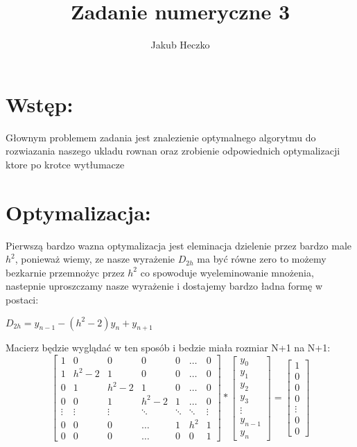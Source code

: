 \documentclass[12pt]{article}
\title{Zadanie numeryczne 3}
\author{Jakub Heczko}
\date{}
\begin{document}
\section{Wstęp:}
Głownym problemem zadania jest znalezienie optymalnego algorytmu do rozwiazania naszego ukladu rownan oraz zrobienie odpowiednich optymalizacji ktore po krotce wytłumacze
\section{Optymalizacja:}
Pierwszą bardzo wazna optymalizacja jest eleminacja dzielenie przez bardzo male $h^{2}$, ponieważ wiemy, ze nasze wyrażenie $D_{2h}$ ma być równe zero to możemy bezkarnie przemnożyc przez $h^2$ co spowoduje wyeleminowanie mnożenia, nastepnie uproszczamy nasze wyrażenie i dostajemy bardzo ładna formę w postaci: 
\newline
\begin{center}
    $D_{2h} = y_{n-1} - (h^{2} - 2)y_{n} + y_{n+1}$
\end{center}
Macierz będzie wyglądać w ten sposób i bedzie miała rozmiar N+1 na N+1:
\[
\begin{bmatrix}
    1 & 0 & 0 & 0 & 0 & \dots & 0\\
    1 & h^{2}-2 & 1 & 0 & 0 & \dots & 0\\ 
    0 & 1 & h^{2}-2 & 1 & 0 & \dots & 0\\
    0 & 0 & 1 & h^{2}-2 & 1 &\dots & 0\\
    \vdots & \vdots & \vdots & \ddots & \ddots & \ddots & \vdots\\
    0 & 0 & 0 & \hdots & 1 & h^{2} & 1\\
    0 & 0 & 0 & \hdots & 0 & 0 & 1
\end{bmatrix}
*
\begin{bmatrix}
    y_{0}\\
    y_{1}\\
    y_{2}\\
    y_{3}\\
    \vdots\\
    y_{n-1}\\
    y_{n}
\end{bmatrix}
=
\begin{bmatrix}
    1\\
    0\\
    0\\
    0\\
    \vdots\\
    0\\
    0
\end{bmatrix}
\]
\end{document}
